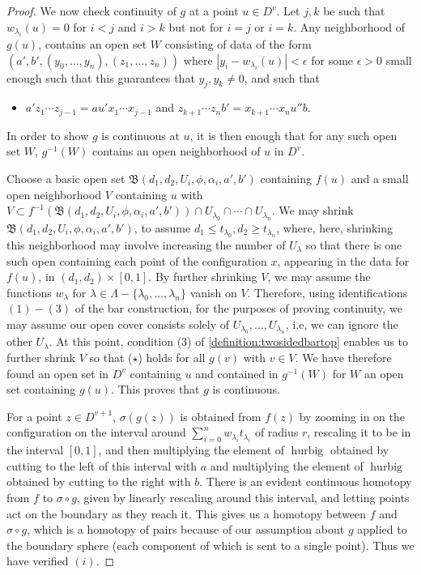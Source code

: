 \documentclass[12 pt]{amsart}
\theoremstyle{plain}
\theoremstyle{definition}
\theoremstyle{remark}
\numberwithin{equation}{section}
\begin{document}
\begin{proof}
	We now check continuity of $g$ at a point $u \in D^v$.
	Let $j,k$ be such that $w_{\lambda_i}(u)=0$ for $i <j$ and $i>k$ but not
	for $i=j$ or $i=k$. Any neighborhood of $g(u)$, contains an open set
	$W$ consisting of data of the form $(a',b',(y_0,\ldots,y_n),
	(z_1,\ldots,z_n))$ where $|y_i-w_{\lambda_i}(u)|<\epsilon$ for some
	$\epsilon>0$ small enough such that this guarantees that $y_j,y_k\neq0$,
	and such that 
	\begin{itemize}
		\item[($\star$)] $a'z_1\cdots z_{j-1}=au'x_1\cdots x_{j-1}$ and
		$z_{k+1}\cdots z_nb' = x_{k+1}\cdots x_nu''b$.
	\end{itemize}
	In order to show $g$ is continuous at $u$, it is then enough that for any such open set $W$, $g^{-1}(W)$ contains an open neighborhood 
	of $u$ in $D^v$.

	Choose a basic open set 
	$\mathfrak B(d_1,d_2,U_i,\phi,\alpha_i,a',b')$ containing $f(u)$ and a
	small open neighborhood $V$ containing $u$ with $V \subset
	f^{-1}(\mathfrak B(d_1,d_2,U_i,\phi,\alpha_i,a',b')) \cap 
	U_{\lambda_0}\cap \cdots \cap U_{\lambda_n}$.
	We may shrink 
	$\mathfrak B(d_1,d_2,U_i,\phi,\alpha_i,a',b')$,
	to assume $d_1\leq t_{\lambda_0},d_2\geq t_{\lambda_n}$,
	where, here, shrinking this neighborhood may involve increasing the
	number of $U_\lambda$ so that there is one such open containing each
	point of the configuration $x$, appearing in the data for $f(u)$, in
	$(d_1, d_2) \times[0,1]$. 
	By further shrinking $V$, we may assume the functions $w_\lambda$ for
	$\lambda \in \Lambda -\{\lambda_0, \ldots, \lambda_n\}$ vanish on $V$.
	Therefore, using identifications $(1)-(3)$ of the bar construction, for the purposes of proving continuity,
	we may assume our open cover consists solely of
	$U_{\lambda_0}, \ldots, U_{\lambda_n}$, i.e, we can ignore the other
	$U_\lambda$.
	At this point, condition 
(3) of \autoref{definition:twosidedbartop} enables us to further shrink $V$ so that
($\star$) holds for all $g(v)$ with $v \in V$.
We have therefore found an open set in $D^v$ containing $u$ and contained in
$g^{-1}(W)$ for $W$ an open set containing $g(u)$. This proves that $g$ is
continuous.
	
	For a point $z \in D^{v+1}$, $\sigma(g(z))$ is obtained from $f(z)$
	by zooming in on the configuration on the interval around $\sum_{i=0}^n w_{\lambda_i}t_{\lambda_i}$ of radius $r$, rescaling it to be in the interval $[0,1]$, and then multiplying the element of $\operatorname{hurbig}$ obtained by cutting to the left of this interval with $a$ and multiplying the element of $\operatorname{hurbig}$ obtained by cutting to the right with $b$. There is an evident continuous homotopy from $f$ to $\sigma\circ g$, given by linearly rescaling around this interval, and letting points act on the boundary as they reach it. This gives us a homotopy between $f$ and $\sigma \circ g$, which is a homotopy of pairs because of our assumption about $g$ applied to the boundary sphere (each component of which is sent to a single point). 
	Thus we have verified $(i)$.
	

\end{proof}
\end{document}
